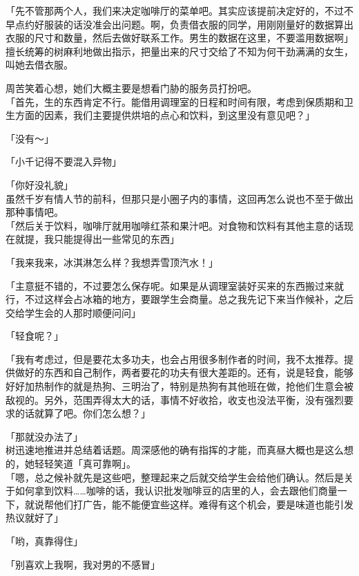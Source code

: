「先不管那两个人，我们来决定咖啡厅的菜单吧。其实应该提前决定好的，不过不早点约好服装的话没准会出问题。啊，负责借衣服的同学，用刚刚量好的数据算出衣服的尺寸和数量，然后去做好联系工作。男生的数据在这里，不要滥用数据啊」\\

擅长统筹的树麻利地做出指示，把量出来的尺寸交给了不知为何干劲满满的女生，叫她去借衣服。

周苦笑着心想，她们大概主要是想看门胁的服务员打扮吧。\\

「首先，生的东西肯定不行。能借用调理室的日程和时间有限，考虑到保质期和卫生方面的因素，我们主要提供烘培的点心和饮料，到这里没有意见吧？」

「没有～」

「小千记得不要混入异物」

「你好没礼貌」\\

虽然千岁有情人节的前科，但那只是小圈子内的事情，这回再怎么说也不至于做出那种事情吧。\\

「然后关于饮料，咖啡厅就用咖啡红茶和果汁吧。对食物和饮料有其他主意的话现在就提，我只能提得出一些常见的东西」

「我来我来，冰淇淋怎么样？我想弄雪顶汽水！」

「主意挺不错的，不过要怎么保存呢。如果是从调理室装好买来的东西搬过来就行，不过这样会占冰箱的地方，要跟学生会商量。总之我先记下来当作候补，之后交给学生会的人那时顺便问问」

「轻食呢？」

「我有考虑过，但是要花太多功夫，也会占用很多制作者的时间，我不太推荐。提供做好的东西和自己制作，两者要花的功夫有很大差距的。还有，说是轻食，能够好好加热制作的就是热狗、三明治了，特别是热狗有其他班在做，抢他们生意会被敌视的。另外，范围弄得太大的话，事情不好收拾，收支也没法平衡，没有强烈要求的话就算了吧。你们怎么想？」

「那就没办法了」\\

树迅速地推进并总结着话题。周深感他的确有指挥的才能，而真昼大概也是这么想的，她轻轻笑道「真可靠啊」。\\

「嗯，总之候补就先是这些吧，整理起来之后就交给学生会给他们确认。然后是关于如何拿到饮料……咖啡的话，我认识批发咖啡豆的店里的人，会去跟他们商量一下，就说帮他们打广告，能不能便宜些这样。难得有这个机会，要是味道也能引发热议就好了」

「哟，真靠得住」

「别喜欢上我啊，我对男的不感冒」\\

